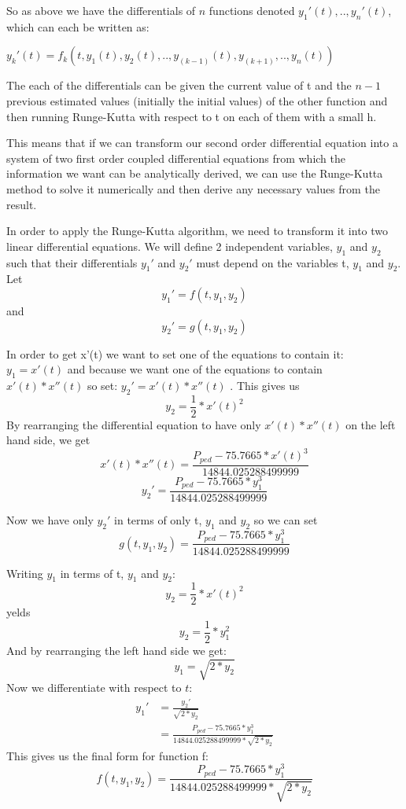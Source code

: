 \documentclass[10pt, a4paper]{report}
\begin{document}
So as above we have the differentials of $n$ functions denoted $y_1'(t),..,y_n'(t)$, which can each be written as: \\

{\centering $y_k'(t) = f_k(t,y_1(t),y_2(t),..,y_{(k-1)}(t),y_{(k+1)},..,y_n(t))$ \newline \par}

The each of the differentials can be given the current value of t and the $n - 1$ previous estimated values (initially the initial values) of the other function and then running Runge-Kutta with respect to t on each of them with a small h. \newline \par

This means that if we can transform our second order differential equation into a system of two first order coupled differential equations from which the information we want can be analytically derived, we can use the Runge-Kutta method to solve it numerically and then derive any necessary values from the result. \newline \par

In order to apply the Runge-Kutta algorithm, we need to transform it into two linear differential equations. We will define 2 independent variables, $y_1$ and $y_2$ such that their differentials $y_1'$ and $y_2'$ must depend on the variables t, $y_1$ and $y_2$. Let
$$ y_1' = f( t, y_1, y_2 )$$ and $$y_2' = g( t, y_1, y_2 )$$

In order to get x'(t) we want to set one of the equations to contain it: $y_1 = x'(t)$ and because we want one of the equations to contain $x'(t) * x''(t) $ so set: $y_2' = x'( t ) * x''( t )$ .
This gives us $$ y_{2} = \frac{1}{2} * x'(t)^2 $$
By rearranging the differential equation to have only $ x'( t ) * x''( t )$ on the left hand side, we get
$$ x'( t ) * x''( t ) = \frac{P_{ped} - 75.7665 * x'( t ) ^ 3}{14844.025288499999}$$
$$ y_2' = \frac{P_{ped} - 75.7665 * y_1 ^ 3}{14844.025288499999}$$

Now we have only $y_2'$ in terms of only t, $y_1$ and $y_2$ so we can set $$ g( t, y_1, y_2 ) = \frac{P_{ped} - 75.7665 * y_1 ^ 3}{14844.025288499999}$$

Writing $y_1$ in terms of t, $y_1$ and $y_2$: $$y_2 = \frac{1}{2} * x'(t)^2$$ yelds $$y_2 = \frac{1}{2} * y_1^2$$
And by rearranging the left hand side we get:
$$y_1 = \sqrt{2 * y_2}$$
Now we differentiate with respect to $t$:
\begin{align*}
y_1' & = \frac{y_2'}{\sqrt{2 * y_2}}\\
& = \frac{P_{ped} - 75.7665 * y_1 ^ 3}{14844.025288499999 * \sqrt{2 * y_2}}
\end{align*}
This gives us the final form for function f:
$$ f(t, y_1, y_2) = \frac{P_{ped} - 75.7665 * y_1 ^ 3}{14844.025288499999 * \sqrt{2 * y_2}}$$
\end{document}
